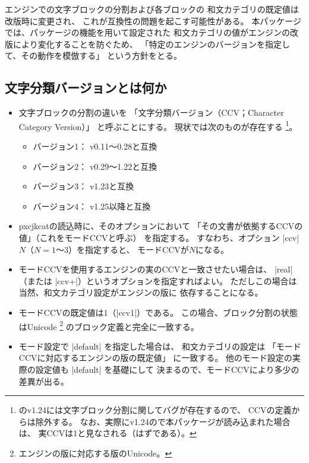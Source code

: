 \documentclass[uplatex,dvipdfmx,a4paper]{jsarticle}
\newcommand{\Pkg}[1]{\textsf{#1}}
\newcommand{\strong}{\textsf}
\begin{document}
\bigskip

{\upTeX}エンジンでの文字ブロックの分割および各ブロックの
和文カテゴリの既定値は改版時に変更され、
これが互換性の問題を起こす可能性がある。
本パッケージでは、パッケージの機能を用いて設定された
和文カテゴリの値がエンジンの改版により変化することを防ぐため、
「特定のエンジンのバージョンを指定して、その動作を模倣する」
という方針をとる。

\subsection{文字分類バージョンとは何か}

\begin{itemize}
\item 文字ブロックの分割の違いを
  「\strong{文字分類バージョン}（CCV；Character Category Version）」
  と呼ぶことにする。
  現状では次のものが存在する
  \footnote{{\upTeX}のv1.24には文字ブロック分割に関してバグが存在するので、
    CCVの定義からは除外する。
    なお、実際にv1.24の{\upTeX}で本パッケージが読み込まれた場合は、
    実CCVは1と見なされる（はずである）。}。
  \begin{itemize}
  \item バージョン1： {\upTeX} v0.11～0.28と互換
  \item バージョン2： {\upTeX} v0.29～1.22と互換
  \item バージョン3： {\upTeX} v1.23と互換
  \item バージョン4： {\upTeX} v1.25以降と互換
  \end{itemize}

\item \Pkg{pxcjkcat}の読込時に、そのオプションにおいて
  「その文書が依拠するCCVの値」（これを\strong{モードCCV}と呼ぶ）
  を指定する。
  すなわち、オプション |ccv|$N$（$N=\mbox{1～3}$）を指定すると、
  モードCCVが$N$になる。

\item モードCCVを使用するエンジンの実のCCVと一致させたい場合は、
  |real|（または |ccv+|）というオプションを指定すればよい。
  ただしこの場合は当然、和文カテゴリ設定がエンジンの版に
  依存することになる。

\item モードCCVの既定値は1（|ccv1|）である。
  この場合、ブロック分割の状態はUnicode%
  \footnote{エンジンの版に対応する版のUnicode。}%
  のブロック定義と完全に一致する。

\item モード設定で |default| を指定した場合は、
  和文カテゴリの設定は
  「モードCCVに対応するエンジンの版の既定値」
  に一致する。
  他のモード設定の実際の設定値も |default| を基礎にして
  決まるので、モードCCVにより多少の差異が出る。

\end{itemize}
\end{document}
